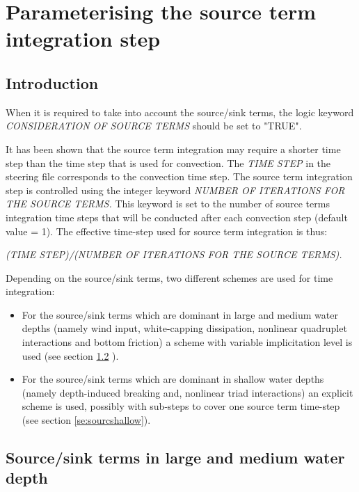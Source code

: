 \section{ Parameterising the source term integration step}


\subsection{ Introduction}

 When it is required to take into account the source/sink terms, the logic keyword \textit{CONSIDERATION OF SOURCE TERMS }should be set to "TRUE".

 It has been shown that the source term integration may require a shorter time step than the time step that is used for convection. The \textit{TIME STEP} in the steering file corresponds to the convection time step. The source term integration step is controlled using the integer keyword \textit{NUMBER OF ITERATIONS FOR THE SOURCE TERMS.} This keyword is set to the number of source terms integration time steps that will be conducted after each convection step (default value = 1). The effective time-step used for source term integration is thus:

 \textit{(TIME STEP)/(NUMBER OF ITERATIONS FOR THE SOURCE TERMS).}

 Depending on the source/sink terms, two different schemes are used for time integration:

\begin{itemize}
\item  For the source/sink terms which are dominant in large and medium water depths (namely wind input, white-capping dissipation, nonlinear quadruplet interactions and bottom friction) a scheme with variable implicitation level is used (see section \ref{se:sourclarge}
).

\item  For the source/sink terms which are dominant in shallow water depths (namely depth-induced breaking and, nonlinear triad interactions) an explicit scheme is used, possibly with sub-steps to cover one source term time-step (see section \ref{se:sourcshallow}).
\end{itemize}


\subsection{ Source/sink terms in large and medium water depth}
\label{se:sourclarge}


